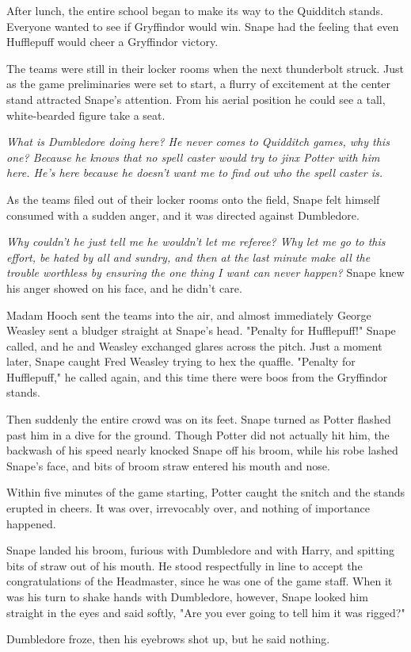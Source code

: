 After lunch, the entire school began to make its way to the Quidditch stands. Everyone wanted to see if Gryffindor would win. Snape had the feeling that even Hufflepuff would cheer a Gryffindor victory.

The teams were still in their locker rooms when the next thunderbolt struck. Just as the game preliminaries were set to start, a flurry of excitement at the center stand attracted Snape's attention. From his aerial position he could see a tall, white-bearded figure take a seat.

\emph{What is Dumbledore doing here? He never comes to Quidditch games, why this one?{\el} Because he knows that no spell caster would try to jinx Potter with him here. He's here because he doesn't want me to find out who the spell caster is.}

As the teams filed out of their locker rooms onto the field, Snape felt himself consumed with a sudden anger, and it was directed against Dumbledore.

\emph{Why couldn't he just tell me he wouldn't let me referee? Why let me go to this effort, be hated by all and sundry, and then at the last minute make all the trouble worthless by ensuring the one thing I want can never happen?} Snape knew his anger showed on his face, and he didn't care.

Madam Hooch sent the teams into the air, and almost immediately George Weasley sent a bludger straight at Snape's head. "Penalty for Hufflepuff!" Snape called, and he and Weasley exchanged glares across the pitch. Just a moment later, Snape caught Fred Weasley trying to hex the quaffle. "Penalty for Hufflepuff," he called again, and this time there were boos from the Gryffindor stands.

Then suddenly the entire crowd was on its feet. Snape turned as Potter flashed past him in a dive for the ground. Though Potter did not actually hit him, the backwash of his speed nearly knocked Snape off his broom, while his robe lashed Snape's face, and bits of broom straw entered his mouth and nose.

Within five minutes of the game starting, Potter caught the snitch and the stands erupted in cheers. It was over, irrevocably over, and nothing of importance happened.

Snape landed his broom, furious with Dumbledore and with Harry, and spitting bits of straw out of his mouth. He stood respectfully in line to accept the congratulations of the Headmaster, since he was one of the game staff. When it was his turn to shake hands with Dumbledore, however, Snape looked him straight in the eyes and said softly, "Are you ever going to tell him it was rigged?"

Dumbledore froze, then his eyebrows shot up, but he said nothing. 


